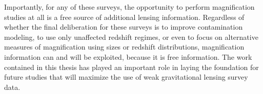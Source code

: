 Importantly, for any of these surveys, the opportunity to perform magnification studies at all is a free source of additional lensing information. Regardless of whether the final deliberation for these surveys is to improve contamination modeling, to use only unaffected redshift regimes, or even to focus on alternative measures of magnification using sizes or redshift distributions, magnification information can and will be exploited, because it is free information. The work contained in this thesis has played an important role in laying the foundation for future studies that will maximize the use of weak gravitational lensing survey data.


\endinput
Any text after an \endinput is ignored.
You could put scraps here or things in progress.
